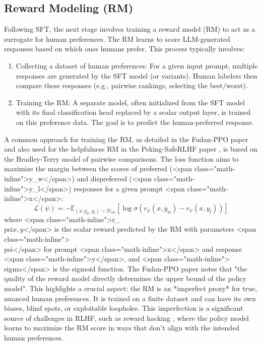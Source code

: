 \documentclass[10pt,journal,compsoc]{IEEEtran} %
\begin{document}
\subsection{Reward Modeling (RM)}
Following SFT, the next stage involves training a reward model (RM) to act as a surrogate for human preferences. The RM learns to score LLM-generated responses based on which ones humans prefer. This process typically involves:
\begin{enumerate}
    \item Collecting a dataset of human preferences: For a given input prompt, multiple responses are generated by the SFT model (or variants). Human labelers then compare these responses (e.g., pairwise rankings, selecting the best/worst). \cite{Zheng2023PPO}
    \item Training the RM: A separate model, often initialized from the SFT model with its final classification head replaced by a scalar output layer, is trained on this preference data. The goal is to predict the human-preferred response.
\end{enumerate}
A common approach for training the RM, as detailed in the Fudan-PPO paper \cite{Zheng2023PPO} and also used for the helpfulness RM in the Peking-SafeRLHF paper \cite{Dai2023SafeRLHF}, is based on the Bradley-Terry model of pairwise comparisons. The loss function aims to maximize the margin between the scores of preferred (<span class="math-inline">y\_w</span>) and dispreferred (<span class="math-inline">y\_l</span>) responses for a given prompt <span class="math-inline">x</span>:
$$ \mathcal{L}(\psi) = -\mathbb{E}_{(x,y_w,y_l)\sim\mathcal{D}_{rm}}[\log \sigma(r_\psi(x,y_w) - r_\psi(x,y_l))] $$
where <span class="math-inline">r\_\\psi\(x,y\)</span> is the scalar reward predicted by the RM with parameters <span class="math-inline">\\psi</span> for prompt <span class="math-inline">x</span> and response <span class="math-inline">y</span>, and <span class="math-inline">\\sigma</span> is the sigmoid function. The Fudan-PPO paper notes that "the quality of the reward model directly determines the upper bound of the policy model". \cite{Zheng2023PPO} This highlights a crucial aspect: the RM is an *imperfect proxy* for true, nuanced human preferences. It is trained on a finite dataset and can have its own biases, blind spots, or exploitable loopholes. This imperfection is a significant source of challenges in RLHF, such as reward hacking \cite{Zhang2024EnergyLoss}, where the policy model learns to maximize the RM score in ways that don't align with the intended human preferences.
\end{document}
